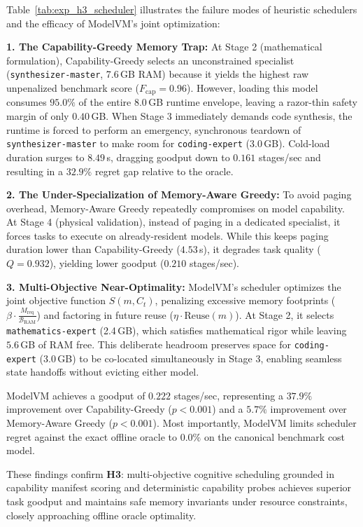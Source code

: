 Table~\ref{tab:exp_h3_scheduler} illustrates the failure modes of heuristic schedulers and the efficacy of ModelVM's joint optimization:

\textbf{1. The Capability-Greedy Memory Trap:} At Stage 2 (mathematical formulation), Capability-Greedy selects an unconstrained specialist (\texttt{synthesizer-master}, 7.6\,GB RAM) because it yields the highest raw unpenalized benchmark score ($F_{\text{cap}} = 0.96$). However, loading this model consumes $95.0\%$ of the entire 8.0\,GB runtime envelope, leaving a razor-thin safety margin of only $0.40$\,GB. When Stage 3 immediately demands code synthesis, the runtime is forced to perform an emergency, synchronous teardown of \texttt{synthesizer-master} to make room for \texttt{coding-expert} (3.0\,GB). Cold-load duration surges to $8.49$\,s, dragging goodput down to $0.161$ stages/sec and resulting in a $32.9\%$ regret gap relative to the oracle.

\textbf{2. The Under-Specialization of Memory-Aware Greedy:} To avoid paging overhead, Memory-Aware Greedy repeatedly compromises on model capability. At Stage 4 (physical validation), instead of paging in a dedicated specialist, it forces tasks to execute on already-resident models. While this keeps paging duration lower than Capability-Greedy ($4.53$\,s), it degrades task quality ($Q = 0.932$), yielding lower goodput ($0.210$ stages/sec).

\textbf{3. Multi-Objective Near-Optimality:} ModelVM's scheduler optimizes the joint objective function $S(m, C_t)$, penalizing excessive memory footprints ($\beta \cdot \frac{M_{\text{req}}}{\mathcal{B}_{\text{RAM}}}$) and factoring in future reuse ($\eta \cdot \text{Reuse}(m)$). At Stage 2, it selects \texttt{mathematics-expert} (2.4\,GB), which satisfies mathematical rigor while leaving $5.6$\,GB of RAM free. This deliberate headroom preserves space for \texttt{coding-expert} (3.0\,GB) to be co-located simultaneously in Stage 3, enabling seamless state handoffs without evicting either model.

ModelVM achieves a goodput of $0.222$ stages/sec, representing a $37.9\%$ improvement over Capability-Greedy ($p < 0.001$) and a $5.7\%$ improvement over Memory-Aware Greedy ($p < 0.001$). Most importantly, ModelVM limits scheduler regret against the exact offline oracle to $0.0\%$ on the canonical benchmark cost model.

These findings confirm \textbf{H3}: multi-objective cognitive scheduling grounded in capability manifest scoring and deterministic capability probes achieves superior task goodput and maintains safe memory invariants under resource constraints, closely approaching offline oracle optimality.

